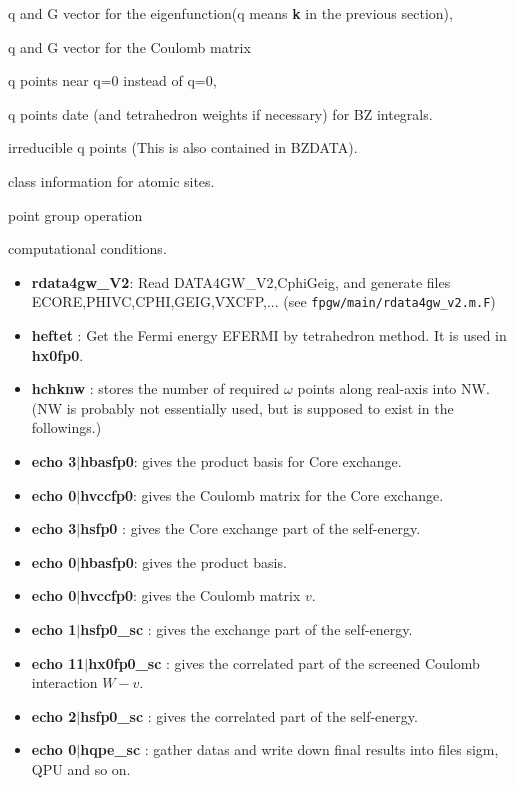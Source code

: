 \documentclass[a4paper,10pt,epsf,fleqn]{article}
\begin{document}
 q and G vector for the eigenfunction(q means {\bf k} in the previous section),

 q and G vector for the Coulomb matrix

   q points near q=0 instead of q=0,

 q points date (and tetrahedron weights if necessary) for BZ integrals. 

  irreducible q points (This is also contained in {\sf BZDATA}).

 class information for atomic sites.

 point group operation

 computational conditions.

\begin{itemize}
\item{\bf rdata4gw\_V2}: 
     Read {\sf DATA4GW\_V2,CphiGeig}, and generate files
     ECORE,PHIVC,CPHI,GEIG,VXCFP,... (see \verb+fpgw/main/rdata4gw_v2.m.F+)
\item{\bf heftet   }: Get the Fermi energy {\sf EFERMI} by tetrahedron method. It is used in {\bf hx0fp0}.
\item{\bf hchknw   }: stores the number of required $\omega$ points along real-axis into {\sf NW}. \\
{\small ({\sf NW} is probably not essentially used, but is supposed to exist in the followings.)}
\item{\bf echo 3$|$hbasfp0}: gives the product basis for Core exchange.
\item{\bf echo 0$|$hvccfp0}: gives the Coulomb matrix for the Core exchange.
\item{\bf echo 3$|$hsfp0  }: gives the Core exchange part of the self-energy.
\item{\bf echo 0$|$hbasfp0}: gives the product basis.
\item{\bf echo 0$|$hvccfp0}: gives the Coulomb matrix $v$.
\item{\bf echo 1$|$hsfp0\_sc  }: gives the exchange part of the self-energy.
\item{\bf echo 11$|$hx0fp0\_sc }: gives the correlated part of the screened Coulomb interaction $W-v$.
\item{\bf echo 2$|$hsfp0\_sc  }: gives the correlated part of the self-energy.
\item{\bf echo 0$|$hqpe\_sc   }: gather datas and write down final
     results into files sigm, {\sf QPU} and so on.
\end{itemize}
\end{document}
